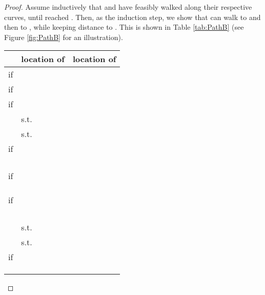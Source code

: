 \documentclass[a4paper,UKenglish]{lipics}
\begin{document}
\begin{proof}
Assume inductively that  and  have feasibly walked along 
their respective curves, until  reached .
Then, as the induction step, 
we 
show that
 can walk to  and then to  
, while keeping distance  to .
This is shown in Table \ref{tab:PathB}
 (see Figure \ref{fig:PathB} for an illustration). 


\begin{table}[h]
\centering
\begin{tabular}{ r | l | l  }
  & location of  & location of   
 \\
\hline
   if   &  &  \\
   if   &  & \\
   if   &  & \\

\hline
	&   s.t.   & \\
	&  	 s.t.   & \\

\hline
if  &  				   & \\
&  & \\
&  & \\

&   &  \\
&  & 
 \\




if  &  				   & \\

 &  &  \\
 &  &  \\


 &   &  \\






if  &  				   & \\
&  & \\
 & &  \\
 & &  \\
&   &  \\


\hline

	&   s.t.   & \\
	&  	 s.t.   & \\
\hline




if  &  		 		   & \\

 &  &  \\
 &  &  \\


 &   &  \\







\end{tabular}
\end{table}
\end{proof}
\end{document}
